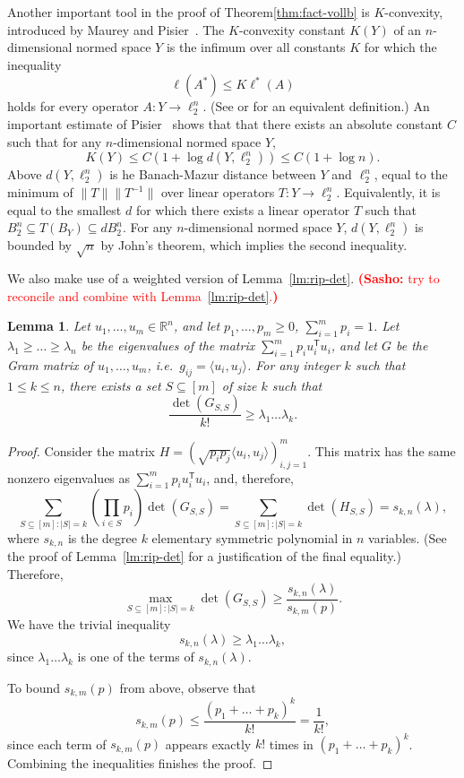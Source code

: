 \documentclass[11pt]{article}
\newtheorem{lemma}{Lemma}
\newcommand{\R}{{\mathbb{R}}}
\newcommand{\T}{\mathsf T}
\newcommand{\notename}[2]{{\textcolor{red}{{\bf (#1:} {#2}{\bf ) }}}}
\newcommand{\notename}[2]{{\textcolor{red}{\footnotesize{\bf (#1:} {#2}{\bf ) }}}}
\newcommand{\snote}[1]{{\notename{Sasho}{#1}}}
\newcommand{\notename}[2]{{}}
\newcommand{\snote}[1]{}
\begin{document}
Another important tool in the proof of Theorem\ref{thm:fact-vollb} is
$K$-convexity, introduced by Maurey and Pisier~\cite{MP76}. The
$K$-convexity constant $K(Y)$ of an $n$-dimensional normed space $Y$
is the infimum over all constants $K$ for which the inequality
\begin{equation}
  \label{eq:K-conv-def}
\ell(A^*) \le K\ell^*(A)
\end{equation}
holds for every operator $A:Y \to \ell_2^n$. (See
\cite{Pisier-book} or \cite{TJ-book} for an equivalent definition.)
An important estimate of Pisier~\cite{P80} shows that that there
exists an absolute constant $C$ such that for any $n$-dimensional
normed space $Y$, 
\begin{equation}
  \label{eq:K-conv-Pisier}
  K(Y) \le C(1+\log d(Y,\ell_2^n))\le C(1+\log n).
\end{equation}
Above $d(Y, \ell_2^n)$ is he Banach-Mazur distance between $Y$ and
$\ell_2^n$, equal to the minimum of $\|T\| \|T^{-1}\|$ over linear
operators $T:Y \to \ell_2^n$. Equivalently, it is equal to the
smallest $d$ for which there exists a linear operator $T$ such that
$B_2^n \subseteq T(B_Y) \subseteq d B_2^n$. For any $n$-dimensional
normed space $Y$, $d(Y,\ell_2^n)$ is bounded by $\sqrt{n}$ by John's
theorem, which implies the second inequality.

We also make use of a weighted version of Lemma~\ref{lm:rip-det}.
\snote{try to reconcile and combine with Lemma~\ref{lm:rip-det}.}
\begin{lemma}\label{lm:rip-det-weighted}
  Let $u_1, \ldots, u_m \in \R^n$, and let $p_1, \ldots, p_m \ge 0$,
  $\sum_{i = 1}^mp_i = 1$. Let $\lambda_1 \ge \ldots \ge \lambda_n$ be
  the eigenvalues of the matrix $\sum_{i=1}^m{p_i u_i^\T u_i}$, and
  let $G$ be the Gram matrix of $u_1, \ldots, u_m$, i.e.~$g_{ij} =
  \langle u_i, u_j\rangle$. For any integer $k$ such that $1 \le k \le
  n$, there exists a set $S \subseteq [m]$ of size $k$ such that
  \[
  \frac{\det(G_{S,S})}{k!} \ge\lambda_1 \ldots \lambda_k. 
  \]
\end{lemma}
\begin{proof}
  Consider the matrix $H = (\sqrt{p_ip_j}\langle u_i, u_j
  \rangle)_{i,j = 1}^m$. This matrix has the same nonzero eigenvalues as
  $\sum_{i=1}^m{p_i u_i^\T u_i}$, and, therefore,
  \[
  \sum_{S \subseteq [m]: |S| = k}{\left(\prod_{i \in S}{p_i}\right)\det(G_{S,S})}
  = \sum_{S \subseteq [m]: |S| = k}\det(H_{S,S}) = s_{k,n}(\lambda),
  \]
  where $s_{k,n}$ is the degree $k$ elementary symmetric polynomial in $n$
  variables. (See the proof of Lemma~\ref{lm:rip-det} for a
  justification of the final equality.) Therefore, 
  \[
  \max_{S \subseteq [m]: |S| = k}\det(G_{S,S}) 
  \ge \frac{s_{k,n}(\lambda)}{s_{k,m}(p)}. 
  \]
  We have the trivial inequality
  \[
  s_{k,n}(\lambda) \ge \lambda_1 \ldots \lambda_k,
  \]
  since $\lambda_1 \ldots \lambda_k$ is one of the terms of
  $s_{k,n}(\lambda)$. 
  
  To bound $s_{k,m}(p)$ from above, observe that
  \[
  s_{k,m}(p) \le \frac{(p_1 + \ldots + p_k)^k}{k!} = \frac{1}{k!},
  \]
  since each term of $s_{k,m}(p)$ appears exactly $k!$ times in 
  $(p_1 + \ldots + p_k)^k$.  Combining the inequalities finishes the proof. 
\end{proof}
\end{document}
